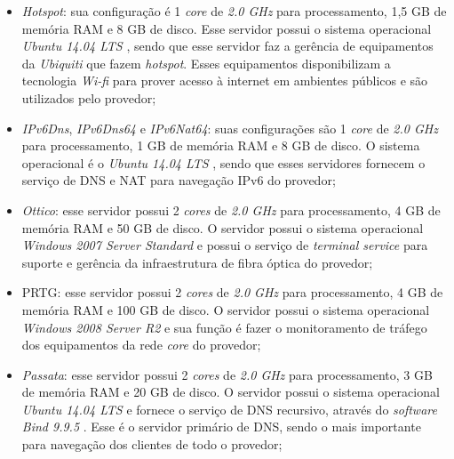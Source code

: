 \begin{itemize}
 \item \textit{Hotspot}: sua configuração é 1 \textit{core} de \textit{2.0 GHz} para processamento, 1,5 GB de memória RAM e 8 GB de disco. 
 Esse servidor possui o sistema operacional \textit{Ubuntu 14.04 \ac{LTS}} \cite{ubuntu}, sendo que esse servidor faz a gerência de equipamentos 
 da \textit{Ubiquiti} que fazem \textit{hotspot}. Esses equipamentos disponibilizam a tecnologia \textit{Wi-fi} para prover acesso à internet em 
 ambientes públicos e são utilizados pelo provedor;
 
 \item \textit{IPv6Dns}, \textit{IPv6Dns64} e \textit{IPv6Nat64}: suas configurações são 1 \textit{core} de \textit{2.0 GHz} para processamento, 
 1 GB de memória RAM e 8 GB de disco. O sistema operacional é o \textit{Ubuntu 14.04 \ac{LTS}} \cite{ubuntu}, sendo que esses servidores fornecem 
 o serviço de \ac{DNS} e \ac{NAT} para navegação \ac{IPv6} do provedor;
 
 \item \textit{Ottico}: esse servidor possui 2 \textit{cores} de \textit{2.0 GHz} para processamento, 4 GB de memória RAM e 50 GB de disco. 
 O servidor possui o sistema operacional \textit{Windows 2007 Server Standard} e possui o serviço de \textit{terminal service} para suporte e 
 gerência da infraestrutura de fibra óptica do provedor;
 
 \item \ac{PRTG}: esse servidor possui 2 \textit{cores} de \textit{2.0 GHz} para processamento, 4 GB de memória RAM e 100 GB de disco. 
 O servidor possui o sistema operacional \textit{Windows 2008 Server R2} e sua função é fazer o monitoramento de tráfego dos equipamentos da 
 rede \textit{core} do provedor;
 
 \item \textit{Passata}: esse servidor possui 2 \textit{cores} de \textit{2.0 GHz} para processamento, 3 GB de memória RAM e 20 GB de disco. 
 O servidor possui o sistema operacional \textit{Ubuntu 14.04 \ac{LTS}} \cite{ubuntu} e fornece o serviço de \ac{DNS} recursivo, através do 
 \textit{software} \textit{Bind 9.9.5} \cite{bind}. Esse é o servidor primário de \ac{DNS}, sendo o mais importante para navegação dos clientes 
 de todo o provedor;
 

\end{itemize}
